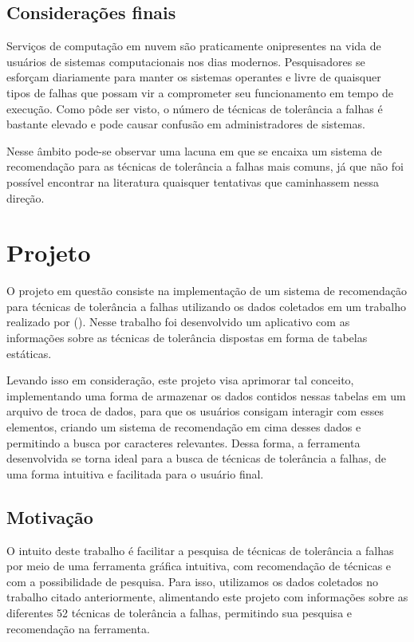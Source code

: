 \documentclass[
	12pt,				%
	oneside,			%
	a4paper,			%
	chapter=TITLE,		%
	english,			%
	french,				%
	spanish,			%
	brazil				%
	]{abntex2}
\begin{document}
\section{Considerações finais}

Serviços de computação em nuvem são praticamente onipresentes na vida de usuários de sistemas computacionais nos dias modernos. Pesquisadores se esforçam diariamente para manter os sistemas operantes e livre de quaisquer tipos de falhas que possam vir a comprometer seu funcionamento em tempo de execução. Como pôde ser visto, o número de técnicas de tolerância a falhas é bastante elevado e pode causar confusão em administradores de sistemas.

Nesse âmbito pode-se observar uma lacuna em que se encaixa um sistema de recomendação para as técnicas de tolerância a falhas mais comuns, já que não foi possível encontrar na literatura quaisquer tentativas que caminhassem nessa direção.

\chapter{Projeto}\label{cap_projeto}

O projeto em questão consiste na implementação de um sistema de recomendação para técnicas de tolerância a falhas utilizando os dados coletados em um trabalho realizado por \citeauthor{andrade2019taxonomia} (\citeyear{andrade2019taxonomia}). Nesse trabalho foi desenvolvido um aplicativo com as informações sobre as técnicas de tolerância dispostas em forma de tabelas estáticas.

Levando isso em consideração, este projeto visa aprimorar tal conceito, implementando uma forma de armazenar os dados contidos nessas tabelas em um arquivo de troca de dados, para que os usuários consigam interagir com esses elementos, criando um sistema de recomendação em cima desses dados e permitindo a busca por caracteres relevantes. Dessa forma, a ferramenta desenvolvida se torna ideal para a busca de técnicas de tolerância a falhas, de uma forma intuitiva e facilitada para o usuário final.

\section{Motivação}

O intuito deste trabalho é facilitar a pesquisa de técnicas de tolerância a falhas por meio de uma ferramenta gráfica intuitiva, com recomendação de técnicas e com a possibilidade de pesquisa. Para isso, utilizamos os dados coletados no trabalho citado anteriormente, alimentando este projeto com informações sobre as diferentes 52 técnicas de tolerância a falhas, permitindo sua pesquisa e recomendação na ferramenta.
\end{document}
